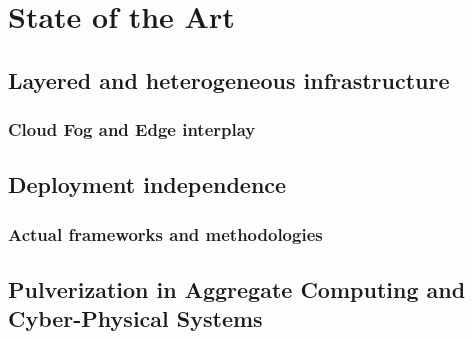 \chapter{State of the Art} %
\label{chap:background}

\section{Layered and heterogeneous infrastructure}
\label{sec:layered-heterogeneous-infrastructure}

\subsection{Cloud Fog and Edge interplay}
\label{sec:cloud-fog-edge-interplay}


\section{Deployment independence}
\label{sec:deployment-independence}

\subsection{Actual frameworks and methodologies}
\label{sec:actual-frameworks-methodologies}


\section{Pulverization in Aggregate Computing and Cyber-Physical Systems}
\label{sec:pulverization-aggregate-computing-cps}
